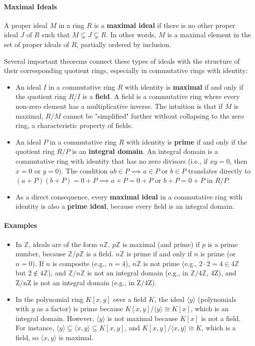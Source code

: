 \documentclass[12pt]{article}
\theoremstyle{definition}
\numberwithin{equation}{subsection}
\begin{document}
\paragraph{Maximal Ideals} 

A proper ideal $M$ in a ring $R$ is a \textbf{maximal ideal} if there is no other proper ideal $J$ of $R$ such that $M \subsetneq J \subsetneq R$. In other words, $M$ is a maximal element in the set of proper ideals of $R$, partially ordered by inclusion.   

Several important theorems connect these types of ideals with the structure of their corresponding quotient rings, especially in commutative rings with identity:
\begin{itemize}
\item An ideal $I$ in a commutative ring $R$ with identity is \textbf{maximal} if and only if the quotient ring $R/I$ is a \textbf{field}. A field is a commutative ring where every non-zero element has a multiplicative inverse. The intuition is that if $M$ is maximal, $R/M$ cannot be "simplified" further without collapsing to the zero ring, a characteristic property of fields.
\item An ideal $P$ in a commutative ring $R$ with identity is \textbf{prime} if and only if the quotient ring $R/P$ is an \textbf{integral domain}. An integral domain is a commutative ring with identity that has no zero divisors (i.e., if $xy=0$, then $x=0$ or $y=0$). The condition $ab \in P \implies a \in P$ or $b \in P$ translates directly to $(a+P)(b+P)=0+P \implies a+P=0+P$ or $b+P=0+P$ in $R/P$.
\item As a direct consequence, every \textbf{maximal ideal} in a commutative ring with identity is also a \textbf{prime ideal}, because every field is an integral domain.
\end{itemize}   

\paragraph{Examples}
\begin{itemize}
\item In $\mathbb{Z}$, ideals are of the form $n\mathbb{Z}$. $p\mathbb{Z}$ is maximal (and prime) if $p$ is a prime number, because $\mathbb{Z}/p\mathbb{Z}$ is a field. $n\mathbb{Z}$ is prime if and only if $n$ is prime (or $n=0$). If $n$ is composite (e.g., $n=4$), $n\mathbb{Z}$ is not prime (e.g., $2\cdot 2=4 \in 4\mathbb{Z}$ but $2 \notin 4\mathbb{Z}$), and $\mathbb{Z}/n\mathbb{Z}$ is not an integral domain (e.g., in $\mathbb{Z}/4\mathbb{Z}$,  
4Z), and Z/nZ is not an integral domain (e.g., in Z/4Z).
\item In the polynomial ring $K[x,y]$ over a field $K$, the ideal $\langle y \rangle$ (polynomials with $y$ as a factor) is prime because $K[x,y]/\langle y \rangle \cong K[x]$, which is an integral domain. However, $\langle y \rangle$ is not maximal because $K[x]$ is not a field. For instance, $\langle y \rangle \subsetneq \langle x,y \rangle \subsetneq K[x,y]$, and $K[x,y]/\langle x,y \rangle \cong K$, which is a field, so $\langle x,y \rangle$ is maximal.
\end{itemize}   
\end{document}
